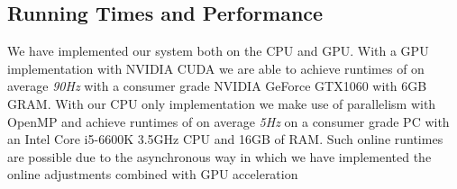 \subsection{Running Times and Performance}
We have implemented our system both on the CPU and GPU. With a GPU implementation with NVIDIA CUDA we are able to achieve runtimes of on average \textit{90Hz} with a consumer grade NVIDIA GeForce GTX1060 with 
6GB GRAM. With our CPU only implementation we make use of parallelism with OpenMP and achieve runtimes of on average \textit{5Hz} on a consumer grade PC with an Intel Core i5-6600K 3.5GHz CPU and 16GB of RAM. Such 
online runtimes are possible due to the asynchronous way in which we have implemented the online adjustments combined with GPU acceleration